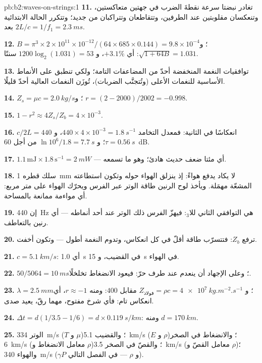 \begin{solution}{pb:b2:waves-on-strings:1}
\textbf{11.} تغادر نبضتا سرعة نقطةَ الضرب في جهتين متعاكستين،
وتنعكسان مقلوبتين عند الطرفين، وتتقاطعان وتتراكبان من جديد؛
وتتكرر الحالة الابتدائية بعد $2L/c = 1/f_1 = \qty{2.3}{ms}$.

\textbf{12.} $B = \pi^3 \times 2 \times 10^{11} \times 10^{-12}/(64 \times 685 \times 0.144) =
9.8 \times 10^{-4}$؛ و $\sqrt{1 + 64B} = 1.031$: أي $+3.1\%$، و $1200\log_2(1.031) = 53$ سنتًا.

\textbf{13.} توافقيات النغمة المنخفضة أحدّ من المضاعفات
التامة؛ ولكي تنطبق على الأنماط الأساسية للنغمات الأعلى
(وتُتجنَّب الضربات)، تُوزَن النغمات العالية أحدّ قليلًا.

\textbf{14.} $Z_s = \mu c = \qty{2.0}{kg/s}$؛ و $r = (2 - 2000)/2002 = -0.998$.

\textbf{15.} $1 - r^2 \approx 4Z_s/Z_b = 4 \times 10^{-3}$.

\textbf{16.} $c/2L = 440$ انعكاسًا في الثانية: فمعدل التخامد $440 \times 4 \times
10^{-3} = \qty{1.8}{s^{-1}}$، و $\tau = \qty{0.56}{s}$؛ و $\ln10^6/1.8 = \qty{7.7}{s}$ من أجل
\qty{60}{dB}.

\textbf{17.} $1.1\,\text{mJ} \times 1.8\,\text{s}^{-1} = \qty{2}{mW}$ --- أي مئتا ضعف
حديث هادئ؛ وهو ما تسمعه.

\textbf{18.} سلك قطره \qty{1}{mm} لا يكاد يدفع هواءً: إذ ينزلق الهواء حوله
وتكون استطاعته المشعّة مهمَلة. ويأخذ لوح الرنين طاقة
الوتر عبر الفرس ويحرّك الهواء على متر مربع:
أي مواءمة ممانعة بالمساحة.

\textbf{19.} إن \qty{440}{Hz} هي التوافقي الثاني للا$_3$: فيهزّ الفرس
ذلك الوتر عند أحد أنماطه --- أي رنين بالتعاطف.

\textbf{20.} ترفع $Z_b$: فتتسرّب طاقة أقلّ في كل انعكاس، وتدوم النغمة
أطول --- وتكون أخفت.

\textbf{21.} $c = \qty{5.1}{km/s}$: أي \qty{1.0}{s} في القضيب، و \qty{15}{s} في الهواء.

\textbf{22.} $50/5064 = \qty{10}{ms}$؛ وعلى الإجهاد أن ينعدم عند طرف حرّ:
فيعود الانضغاط تخلخلًا.

\textbf{23.} $\lambda = \qty{2.5}{mm}$؛ و $Z_{\text{فولاذ}} = \rho c = \qty{4e7}{kg.m^{-2}.s^{-1}}$
مقابل $400$: ومنه $r \approx -1$، أي انعكاس تام: فأي شرخ مفتوح، مهما
رقّ، يعيد صدى.

\textbf{24.} $\Delta t = d(1/3.5 - 1/6) = d \times \qty{0.119}{s/km}$: ومنه $d = \qty{170}{km}$.

\textbf{25.} الوتر \qty{334}{m/s} ($T$ و $\mu$)؛ والقضيب \qty{5.1}{km/s} ($E$ و $\rho$)؛
والانضغاط في الصخر \qty{6}{km/s} (معامل الانضغاط و $\rho$)؛ والقصّ في الصخر \qty{3.5}{km/s}
(معامل القصّ و $\rho$)؛ والهواء \qty{340}{m/s} ($\gamma P$ و $\rho$ --- في الفصل التالي).
\end{solution}
